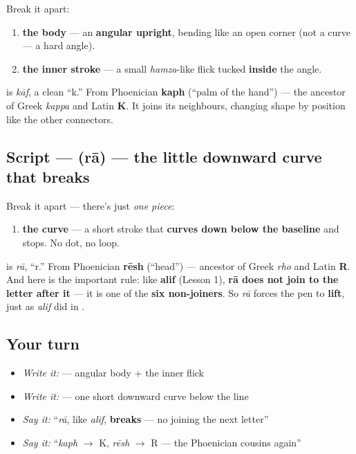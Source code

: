 Break it apart:

\begin{enumerate}
\raggedright
  \item \textbf{the body} — an \textbf{angular upright}, bending like an open corner (not a curve — a hard angle).
  \item \textbf{the inner stroke} — a small \emph{hamza}-like flick tucked \textbf{inside} the angle.
\end{enumerate}

\textbf{} is \emph{kāf}, a clean \textquotedblleft{}k.\textquotedblright{} From Phoenician \textbf{kaph} (\textquotedblleft{}palm of the hand\textquotedblright{}) — the ancestor of Greek \emph{kappa} and Latin \textbf{K}. It joins its neighbours, changing shape by position like the other connectors.

\subsection*{Script —  (rā) — the little downward curve that breaks}
Break it apart — there's just \emph{one piece}:

\begin{enumerate}
\raggedright
  \item \textbf{the curve} — a short stroke that \textbf{curves down below the baseline} and stops. No dot, no loop.
\end{enumerate}

\textbf{} is \emph{rā}, \textquotedblleft{}r.\textquotedblright{} From Phoenician \textbf{rēsh} (\textquotedblleft{}head\textquotedblright{}) — ancestor of Greek \emph{rho} and Latin \textbf{R}. And here is the important rule: like \textbf{alif} (Lesson 1), \textbf{rā does not join to the letter after it} — it is one of the \textbf{six non-joiners}. So \emph{rā} forces the pen to \textbf{lift}, just as \emph{alif} did in \emph{}.

\subsection*{Your turn}
\begin{itemize}
\raggedright
  \item \emph{Write it:} \textbf{} — angular body + the inner flick
  \item \emph{Write it:} \textbf{} — one short downward curve below the line
  \item \emph{Say it:} \textquotedblleft{}\emph{rā}, like \emph{alif}, \textbf{breaks} — no joining the next letter\textquotedblright{}
  \item \emph{Say it:} \textquotedblleft{}\emph{kaph} $\to$ K, \emph{rēsh} $\to$ R — the Phoenician cousins again\textquotedblright{}
\end{itemize}

